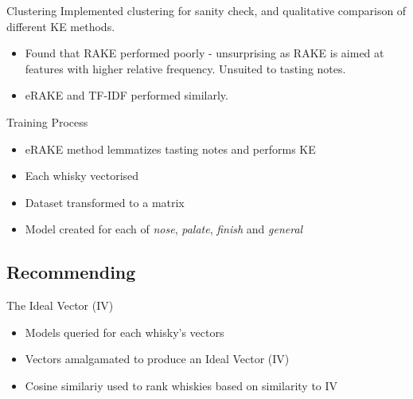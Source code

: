 \documentclass{beamer}
\begin{document}
\begin{frame}{Clustering}
    Implemented clustering for sanity check, and qualitative comparison
    of different KE methods.
    \begin{itemize}
        \item Found that RAKE performed poorly - unsurprising as RAKE is 
        aimed at features with higher relative frequency.  Unsuited to
        tasting notes.
        \item eRAKE and TF-IDF performed similarly.
    \end{itemize}
\end{frame}

\begin{frame}{Training Process}
    \begin{itemize}
        \item eRAKE method lemmatizes tasting notes and performs KE 
        \item Each whisky vectorised
        \item Dataset transformed to a matrix
        \item Model created for each of \emph{nose}, \emph{palate}, \emph{finish} and \emph{general}
    \end{itemize}
\end{frame}

\subsection{Recommending}

\begin{frame}{The Ideal Vector (IV)}
    \begin{itemize}
        \item Models queried for each whisky's vectors
        \item Vectors amalgamated to produce an Ideal Vector (IV)
        \item Cosine similariy used to rank whiskies based on similarity to IV
    \end{itemize}
\end{frame}
\end{document}
